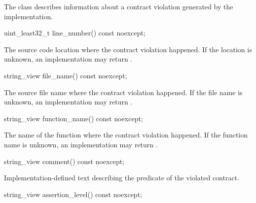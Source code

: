 \pnum
The class  describes information about
a contract violation generated by the implementation.

%
\begin{itemdecl}
uint_least32_t line_number() const noexcept;
\end{itemdecl}

\begin{itemdescr}
\pnum
\returns The source code location
where the contract violation happened.
If the location is unknown, an implementation may return .
\end{itemdescr}

%
\begin{itemdecl}
string_view file_name() const noexcept;
\end{itemdecl}

\begin{itemdescr}
\pnum
\returns The source file name
where the contract violation happened.
If the file name is unknown,
an implementation may return .
\end{itemdescr}

%
\begin{itemdecl}
string_view function_name() const noexcept;
\end{itemdecl}

\begin{itemdescr}
\pnum
\returns The name of the function
where the contract violation happened.
If the function name is unknown,
an implementation may return .
\end{itemdescr}

%
\begin{itemdecl}
string_view comment() const noexcept;
\end{itemdecl}

\begin{itemdescr}
\pnum
\returns Implementation-defined text describing
the predicate of the violated contract.
\end{itemdescr}

%
\begin{itemdecl}
string_view assertion_level() const noexcept;
\end{itemdecl}

